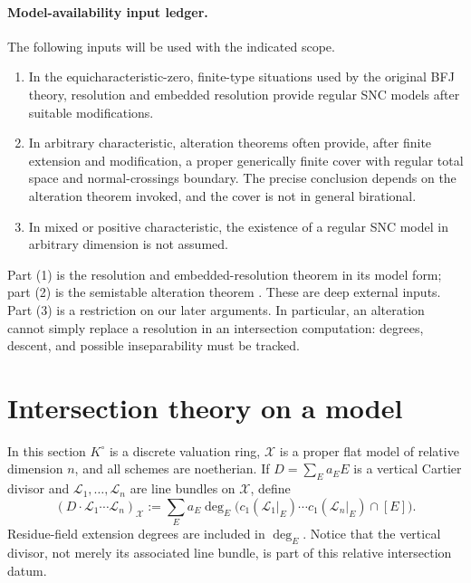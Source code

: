 \paragraph{Model-availability input ledger.}
The following inputs will be used with the indicated scope.
\begin{enumerate}
\item In the equicharacteristic-zero, finite-type situations used by the
  original BFJ theory, resolution and embedded resolution provide regular
  SNC models after suitable modifications.
\item In arbitrary characteristic, alteration theorems often provide, after
  finite extension and modification, a proper generically finite cover with
  regular total space and normal-crossings boundary. The precise conclusion
  depends on the alteration theorem invoked, and the cover is not in general
  birational.
\item In mixed or positive characteristic, the existence of a regular SNC
  model in arbitrary dimension is not assumed.
\end{enumerate}

Part (1) is the resolution and embedded-resolution theorem
\cite{Hironaka1964I,Hironaka1964II} in its model form; part (2) is the
semistable alteration theorem \cite{deJong1996}. These are deep external
inputs. Part (3) is a restriction on our later arguments. In particular, an
alteration cannot simply replace a resolution in an intersection computation:
degrees, descent, and possible inseparability must be tracked.

\section{Intersection theory on a model}

In this section $K^\circ$ is a discrete valuation ring, $\mathcal X$ is a
proper flat model of relative dimension $n$, and all schemes are noetherian.
If $D=\sum_Ea_EE$ is a vertical Cartier divisor and
$\mathcal L_1,\ldots,\mathcal L_n$ are line bundles on $\mathcal X$, define
\[
 (D\cdot\mathcal L_1\cdots\mathcal L_n)_{\mathcal X}
   :=\sum_E a_E
      \deg_E\bigl(c_1(\mathcal L_1|_E)\cdots
                  c_1(\mathcal L_n|_E)\cap[E]\bigr).
\]
Residue-field extension degrees are included in $\deg_E$. Notice that the
vertical divisor, not merely its associated line bundle, is part of this
relative intersection datum.

